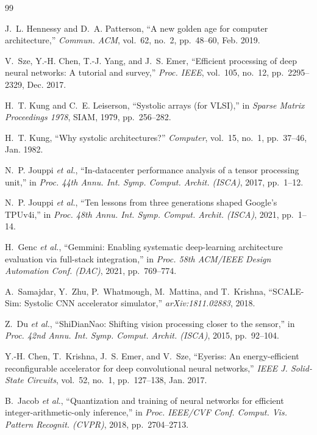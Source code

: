 \documentclass[conference]{IEEEtran}
\begin{document}
\begin{thebibliography}{99}

J.~L. Hennessy and D.~A. Patterson, ``A new golden age for computer
architecture,'' \emph{Commun. ACM}, vol.~62, no.~2, pp.~48--60, Feb. 2019.

V.~Sze, Y.-H. Chen, T.-J. Yang, and J.~S. Emer, ``Efficient processing of deep
neural networks: A tutorial and survey,'' \emph{Proc. IEEE}, vol.~105, no.~12,
pp.~2295--2329, Dec. 2017.

H.~T. Kung and C.~E. Leiserson, ``Systolic arrays (for VLSI),'' in
\emph{Sparse Matrix Proceedings 1978}, SIAM, 1979, pp.~256--282.

H.~T. Kung, ``Why systolic architectures?'' \emph{Computer}, vol.~15, no.~1,
pp.~37--46, Jan. 1982.

N.~P. Jouppi \emph{et al.}, ``In-datacenter performance analysis of a tensor
processing unit,'' in \emph{Proc. 44th Annu. Int. Symp. Comput. Archit. (ISCA)},
2017, pp.~1--12.

N.~P. Jouppi \emph{et al.}, ``Ten lessons from three generations shaped
Google's TPUv4i,'' in \emph{Proc. 48th Annu. Int. Symp. Comput. Archit. (ISCA)},
2021, pp.~1--14.

H.~Genc \emph{et al.}, ``Gemmini: Enabling systematic deep-learning
architecture evaluation via full-stack integration,'' in \emph{Proc. 58th
ACM/IEEE Design Automation Conf. (DAC)}, 2021, pp.~769--774.

A.~Samajdar, Y.~Zhu, P.~Whatmough, M.~Mattina, and T.~Krishna, ``SCALE-Sim:
Systolic CNN accelerator simulator,'' \emph{arXiv:1811.02883}, 2018.

Z.~Du \emph{et al.}, ``ShiDianNao: Shifting vision processing closer to the
sensor,'' in \emph{Proc. 42nd Annu. Int. Symp. Comput. Archit. (ISCA)}, 2015,
pp.~92--104.

Y.-H. Chen, T.~Krishna, J.~S. Emer, and V.~Sze, ``Eyeriss: An energy-efficient
reconfigurable accelerator for deep convolutional neural networks,''
\emph{IEEE J. Solid-State Circuits}, vol.~52, no.~1, pp.~127--138, Jan. 2017.

B.~Jacob \emph{et al.}, ``Quantization and training of neural networks for
efficient integer-arithmetic-only inference,'' in \emph{Proc. IEEE/CVF Conf.
Comput. Vis. Pattern Recognit. (CVPR)}, 2018, pp.~2704--2713.


\end{thebibliography}
\end{document}
